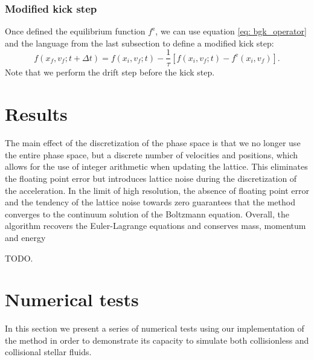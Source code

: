 \documentclass[fleqn,usenatbib]{mnras}
\begin{document}
\subsubsection{Modified kick step}
Once defined the equilibrium function $f^\text{e}$, we can use equation \ref{eq: bgk_operator} and the language from the last subsection to define a modified kick step:
\begin{equation}
f(x_f,v_f;t+\Delta t) = f(x_i,v_f;t) - \frac{1}{\tau}\left[f(x_i,v_f;t)-f^\text{e} (x_i,v_f)\right]\text{.}
\end{equation}
Note that we perform the drift step before the kick step.

\section{Results}
The main effect of the discretization of the phase space is that we no longer use the entire phase space, but a discrete number of velocities and positions, which allows for the use of integer arithmetic when updating the lattice. This eliminates the floating point error but introduces lattice noise during the discretization of the acceleration. In the limit of high resolution, the absence of floating point error and the tendency of the lattice noise towards zero guarantees that the method converges to the continuum solution of the Boltzmann equation. Overall, the algorithm recovers the Euler-Lagrange equations and conserves mass, momentum and energy

TODO.

\section{Numerical tests}
In this section we present a series of numerical tests using our implementation of the method in order to demonstrate its capacity to simulate both collisionless and collisional stellar fluids.   
\end{document}
